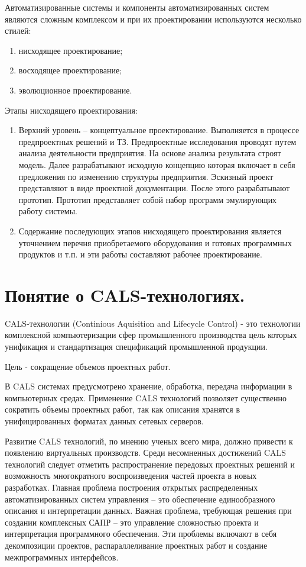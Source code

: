 \documentclass[unicode, 12pt, a4paper, oneside]{article}
\begin{document}
Автоматизированные системы и компоненты автоматизированных систем являются сложным комплексом и при их проектировании используются несколько стилей:

\begin{enumerate}
\item нисходящее проектирование;
\item восходящее проектирование;
\item эволюционное проектирование.
\end{enumerate}

Этапы нисходящего проектирования:

\begin{enumerate}
\item Верхний уровень – концептуальное проектирование. Выполняется в процессе предпроектных решений и ТЗ. Предпроектные исследования проводят путем анализа деятельности предприятия. На основе анализа результата строят модель. Далее разрабатывают исходную концепцию которая включает в себя предложения по изменению структуры предприятия. Эскизный проект представляют в виде проектной документации. После этого разрабатывают прототип. Прототип представляет собой набор программ эмулирующих работу системы.
\item Содержание последующих этапов нисходящего проектирования является уточнением перечня приобретаемого оборудования и готовых программных продуктов и т.п. и эти работы составляют рабочее проектирование.
\end{enumerate}

\section{Понятие о CALS-технологиях.}

CALS-технологии (Continious Aquisition and Lifecycle Control) - это технологии комплексной компьютеризации сфер промышленного производства цель которых унификация и стандартизация спецификаций промышленной продукции.

Цель - сокращение объемов проектных работ.

В CALS системах предусмотрено хранение, обработка, передача информации в компьютерных средах.
Применение CALS технологий позволяет существенно сократить объемы проектных работ, так как описания хранятся в унифицированных форматах данных сетевых серверов.

Развитие CALS технологий, по мнению ученых всего мира, должно привести к появлению виртуальных производств. Среди несомненных достижений CALS технологий следует отметить распространение передовых проектных решений и возможность многократного воспроизведения частей проекта в новых разработках. Главная проблема построения открытых распределенных автоматизированных систем управления – это обеспечение единообразного описания и интерпретации данных. Важная проблема, требующая решения при создании комплексных САПР – это управление сложностью проекта и интерпретация программного обеспечения. Эти проблемы включают в себя декомпозиции проектов, распараллеливание проектных работ и создание межпрограммных интерфейсов.
\end{document}
